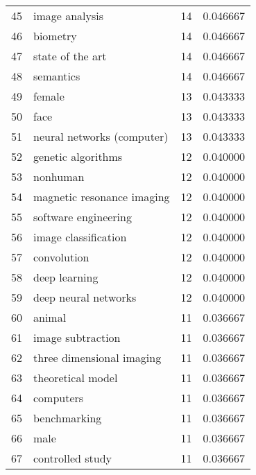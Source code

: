 \begin{tabular}{llrr}
45 &                           image analysis &          14 &    0.046667 \\
46 &                                 biometry &          14 &    0.046667 \\
47 &                         state of the art &          14 &    0.046667 \\
48 &                                semantics &          14 &    0.046667 \\
49 &                                   female &          13 &    0.043333 \\
50 &                                     face &          13 &    0.043333 \\
51 &               neural networks (computer) &          13 &    0.043333 \\
52 &                       genetic algorithms &          12 &    0.040000 \\
53 &                                 nonhuman &          12 &    0.040000 \\
54 &               magnetic resonance imaging &          12 &    0.040000 \\
55 &                     software engineering &          12 &    0.040000 \\
56 &                     image classification &          12 &    0.040000 \\
57 &                              convolution &          12 &    0.040000 \\
58 &                            deep learning &          12 &    0.040000 \\
59 &                     deep neural networks &          12 &    0.040000 \\
60 &                                   animal &          11 &    0.036667 \\
61 &                        image subtraction &          11 &    0.036667 \\
62 &                three dimensional imaging &          11 &    0.036667 \\
63 &                        theoretical model &          11 &    0.036667 \\
64 &                                computers &          11 &    0.036667 \\
65 &                             benchmarking &          11 &    0.036667 \\
66 &                                     male &          11 &    0.036667 \\
67 &                         controlled study &          11 &    0.036667 \\

\end{tabular}
